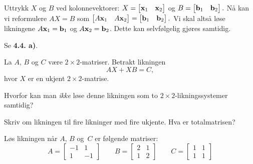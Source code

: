 \begin{losning}
\begin{punkt}
Uttrykk $X$ og $B$ ved kolonnevektorer: $X=\begin{bmatrix}
\mathbf{x}_1 & \mathbf{x}_2
\end{bmatrix}$ og $B=\begin{bmatrix}
\mathbf{b}_1 & \mathbf{b}_2
\end{bmatrix}.$ Nå kan vi reformulere $AX=B$ som $\begin{bmatrix}
A\mathbf{x}_1 & A\mathbf{x}_2
\end{bmatrix}=\begin{bmatrix}
\mathbf{b}_1 & \mathbf{b}_2
\end{bmatrix}.$ Vi skal altså løse likningene $A\mathbf{x}_1=\mathbf{b}_1$ og $A\mathbf{x}_2=\mathbf{b}_2$. Dette kan selvfølgelig gjøres samtidig.
\end{punkt}

\begin{punkt}
Se \textbf{4.4. a)}.
\end{punkt}

\end{losning}

\begin{oppgave}
La $A$, $B$ og $C$ være  $2\times 2$-matriser. Betrakt likningen $$AX+XB=C,$$ hvor $X$ er en ukjent $2\times 2$-matrise.

\begin{punkt}
Hvorfor kan man \emph{ikke} løse denne likningen som to $2\times 2$-likningssystemer samtidig?
\end{punkt}

\begin{punkt}
Skriv om likningen til fire likninger med fire ukjente. Hva er totalmatrisen? 
\end{punkt}


\begin{punkt}
Løs likningen når $A$, $B$ og~$C$ er følgende matriser:
\[
A=\begin{bmatrix}
-1 & 1\\
1 & -1
\end{bmatrix}
\qquad
B=\begin{bmatrix}
2 & 1\\
1 & 2
\end{bmatrix}
\qquad
C=\begin{bmatrix}
1 & 1\\
1 & 1
\end{bmatrix}
\]
\end{punkt}

\end{oppgave}


